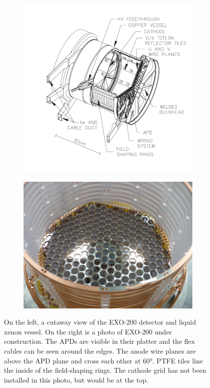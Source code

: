\documentclass[herrin-thesis.tex]{subfiles}
\begin{document}
\begin{figure}
\centering
\begin{subfigure}[c]{0.42\linewidth}
\includegraphics[width=\textwidth]{./photos/detector_TPC.pdf}
\end{subfigure}\hfill%
\begin{subfigure}[c]{0.54\linewidth}
\includegraphics[width=\textwidth]{./photos/detector_half.jpg}
\end{subfigure}\hfill%
\caption[The EXO-200 detector]{On the left, a cutaway view of the EXO-200 detector and liquid xenon vessel. On the right is a photo of EXO-200 under construction. The APDs are visible in their platter and the flex cables can be seen around the edges. The anode wire planes are above the APD plane and cross each other at \ang{60}. PTFE tiles line the inside of the field-shaping rings. The cathode grid has not been installed in this photo, but would be at the top.}
\label{fig:detector_TPC_vessel}
\end{figure}
\end{document}
